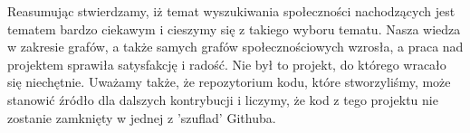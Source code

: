 \documentclass{article}
\begin{document}
Reasumując stwierdzamy, iż temat wyszukiwania społeczności nachodzących jest tematem bardzo ciekawym i cieszymy się z takiego wyboru tematu. Nasza wiedza w zakresie grafów, a także samych grafów społecznościowych wzrosła, a praca nad projektem sprawiła satysfakcję i radość. Nie był to projekt, do którego wracało się niechętnie. Uważamy także, że repozytorium kodu, które stworzyliśmy, może stanowić źródło dla dalszych kontrybucji i liczymy, że kod z tego projektu nie zostanie zamknięty w jednej z 'szuflad' Githuba. \\
\newpage
\printbibliography
\end{document}
